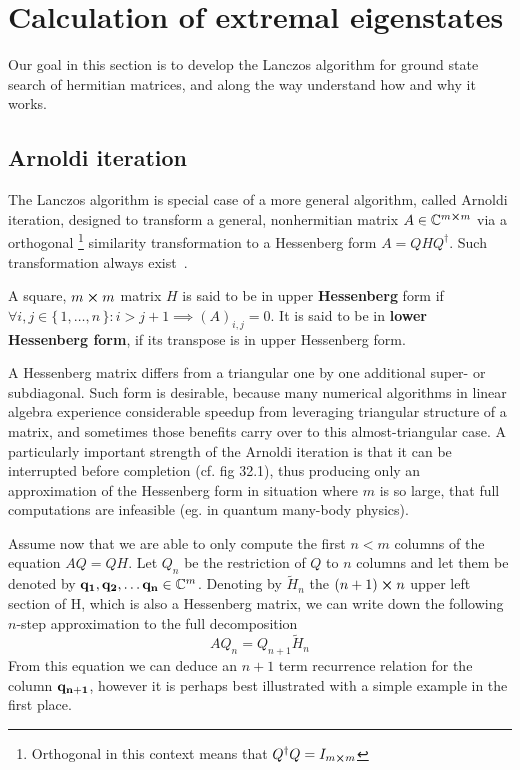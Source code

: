 \section{Calculation of extremal eigenstates}
Our goal in this section is to develop the Lanczos algorithm for ground state search of hermitian matrices, and along
the way understand how and why it works.

\subsection{Arnoldi iteration}
The Lanczos algorithm is special case of a more general algorithm, called Arnoldi iteration, designed to transform
a general, nonhermitian matrix \(A\in \mathbb{C}^{m\cross m} \) via a orthogonal
\footnote{Orthogonal in this context means that \(Q^{\dagger}Q = I_{m \cross m}\)} similarity transformation to a Hessenberg form \(A = QHQ^{\dagger}\).
Such transformation always exist~\autocite{Garcia2017}.


\begin{definition}
    A square, \(m \cross m\) matrix \(H\) is said to be in upper \textbf{Hessenberg} form if
    \(\forall i,j\in \{\,1,\ldots,n\,\}: i > j+1 \implies (A)_{i,j}=0 \).
    It is said to be in \textbf{lower Hessenberg form}, if its transpose is in upper Hessenberg form.
\end{definition}
A Hessenberg matrix differs from a triangular one by one additional super- or subdiagonal.
Such form is desirable, because many numerical algorithms in linear algebra experience considerable speedup
from leveraging triangular structure of a matrix, and sometimes those benefits carry over to this almost-triangular
case. A particularly important strength of the Arnoldi iteration is that it can be interrupted before completion (cf. fig 32.1),
thus producing only an approximation of the Hessenberg form in situation where \(m\) is so large, that
full computations are infeasible (eg. in quantum many-body physics).

Assume now that we are able to only compute the first \(n < m\) columns of the equation \(AQ=QH\).
Let \(Q_n\) be the restriction of \(Q\) to \(n\) columns and let them be denoted by \(\vectorbold{q_1},\vectorbold{q_2}, \ldots 
\vectorbold{ q_n}\in \CC^m\).
Denoting by \(\tilde{H}_n\) the \((n+1)\cross n\) upper left section of H, which is also a Hessenberg matrix, we can 
write down the following \(n\)-step approximation to the full decomposition
\begin{equation}
	AQ_{n}=Q_{n+1}\tilde{H}_{n}
	\label{eq:krylov_n_approx}
\end{equation}
From this equation we can deduce an \(n+1\) term recurrence relation for the column \(\vectorbold{q_{n+1}}\), however
it is perhaps best illustrated with a simple example in the first place.

